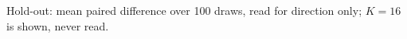 Hold-out: mean paired difference over 100 draws, read for direction only; $K=16$ is shown, never read.
